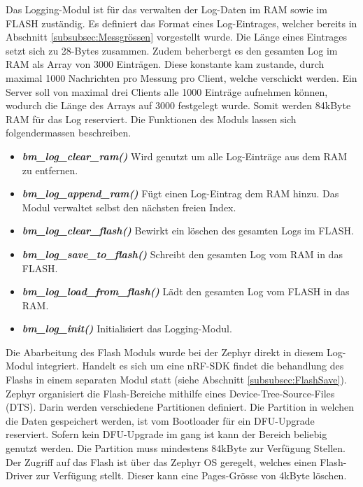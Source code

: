 Das Logging-Modul ist für das verwalten der Log-Daten im RAM sowie im FLASH zuständig. Es definiert das Format eines Log-Eintrages, welcher bereits in Abschnitt \ref{subsubsec:Messgrössen} vorgestellt wurde. Die Länge eines Eintrages setzt sich zu 28-Bytes zusammen. Zudem beherbergt es den gesamten Log im RAM als Array von 3000 Einträgen. Diese konstante kam zustande, durch maximal 1000 Nachrichten pro Messung pro Client, welche verschickt werden. Ein Server soll von maximal drei Clients alle 1000 Einträge aufnehmen können, wodurch die Länge des Arrays auf 3000 festgelegt wurde. Somit werden 84kByte RAM für das Log reserviert. Die Funktionen des Moduls lassen sich folgendermassen beschreiben. 

\begin{itemize}
	\item \textit{\textbf{bm\_log\_clear\_ram()}} Wird genutzt um alle Log-Einträge aus dem RAM zu entfernen.
	\item \textit{\textbf{bm\_log\_append\_ram()}} Fügt einen Log-Eintrag dem RAM hinzu. Das Modul verwaltet selbst den nächsten freien Index. 
	\item \textit{\textbf{bm\_log\_clear\_flash()}} Bewirkt ein löschen des gesamten Logs im FLASH. 
	\item \textit{\textbf{bm\_log\_save\_to\_flash()}} Schreibt den gesamten Log vom RAM in das FLASH. 
	\item \textit{\textbf{bm\_log\_load\_from\_flash()}} Lädt den gesamten Log vom FLASH in das RAM. 
	\item \textit{\textbf{bm\_log\_init()}} Initialisiert das Logging-Modul.
\end{itemize} 

Die Abarbeitung des Flash Moduls wurde bei der Zephyr direkt in diesem Log-Modul integriert. Handelt es sich um eine nRF-SDK findet die behandlung des Flashs in einem separaten Modul statt (siehe Abschnitt \ref{subsubsec:FlashSave}). \\

Zephyr organisiert die Flash-Bereiche mithilfe eines Device-Tree-Source-Files (DTS). Darin werden verschiedene Partitionen definiert. Die Partition in welchen die Daten gespeichert werden, ist vom Bootloader für ein DFU-Upgrade reserviert. Sofern kein DFU-Upgrade im gang ist kann der Bereich beliebig genutzt werden. Die Partition muss mindestens 84kByte zur Verfügung Stellen. Der Zugriff auf das Flash ist über das Zephyr OS geregelt, welches einen Flash-Driver zur Verfügung stellt. Dieser kann eine Pages-Grösse von 4kByte löschen. 

